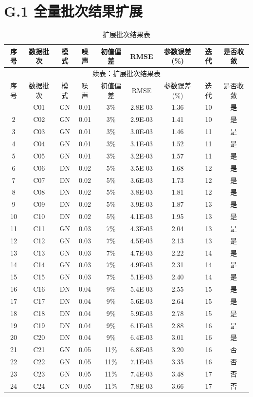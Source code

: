 \section*{G.1 全量批次结果扩展}
{
\scriptsize
\begin{longtable}{ccccccccc}
\caption{扩展批次结果表}\\
\toprule
序号 & 数据批次 & 模式 & 噪声 & 初值偏差 & RMSE & 参数误差(\%) & 迭代 & 是否收敛\\
\midrule
\endfirsthead
\multicolumn{9}{c}{续表：扩展批次结果表}\\
\toprule
序号 & 数据批次 & 模式 & 噪声 & 初值偏差 & RMSE & 参数误差(\%) & 迭代 & 是否收敛\\
\midrule
\endhead
\bottomrule
\endfoot
1&C01&GN&0.01&3\%&2.8E-03&1.36&10&是\\
2&C02&GN&0.01&3\%&2.9E-03&1.41&10&是\\
3&C03&GN&0.01&3\%&3.0E-03&1.46&11&是\\
4&C04&GN&0.01&3\%&3.1E-03&1.52&11&是\\
5&C05&GN&0.01&3\%&3.2E-03&1.57&11&是\\
6&C06&DN&0.02&5\%&3.5E-03&1.68&12&是\\
7&C07&DN&0.02&5\%&3.6E-03&1.73&12&是\\
8&C08&DN&0.02&5\%&3.8E-03&1.81&12&是\\
9&C09&DN&0.02&5\%&3.9E-03&1.87&13&是\\
10&C10&DN&0.02&5\%&4.1E-03&1.95&13&是\\
11&C11&GN&0.03&7\%&4.3E-03&2.04&13&是\\
12&C12&GN&0.03&7\%&4.5E-03&2.13&13&是\\
13&C13&GN&0.03&7\%&4.7E-03&2.22&14&是\\
14&C14&GN&0.03&7\%&4.9E-03&2.31&14&是\\
15&C15&GN&0.03&7\%&5.1E-03&2.40&14&是\\
16&C16&DN&0.04&9\%&5.4E-03&2.55&15&是\\
17&C17&DN&0.04&9\%&5.6E-03&2.64&15&是\\
18&C18&DN&0.04&9\%&5.9E-03&2.78&15&是\\
19&C19&DN&0.04&9\%&6.1E-03&2.88&16&是\\
20&C20&DN&0.04&9\%&6.4E-03&3.01&16&是\\
21&C21&GN&0.05&11\%&6.8E-03&3.20&16&否\\
22&C22&GN&0.05&11\%&7.1E-03&3.35&16&否\\
23&C23&GN&0.05&11\%&7.4E-03&3.48&17&否\\
24&C24&GN&0.05&11\%&7.8E-03&3.66&17&否\\

\end{longtable}}
